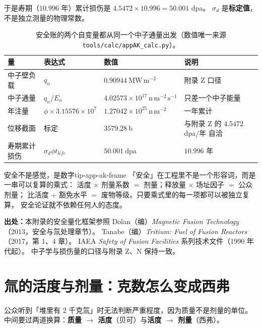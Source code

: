 于是寿期（$10.996$ 年）累计损伤是 $4.5472\times10.996=50.001$ dpa。
$\sigma_d$ 是\textbf{标定值}，不是独立测量的物理常数。

\begin{table}[htbp]
\centering
\small
\caption{安全账的两个自变量都从同一个中子通量出发（数值唯一来源 \texttt{tools/\allowbreak{}calc/\allowbreak{}appAK\_calc.py}）。}
\label{tab:app-ak-frame}
\begin{tabular}{p{3.4cm}p{3.3cm}p{3.1cm}p{3.9cm}}
\toprule
量 & 表达式 & 数值 & 说明 \\
\midrule
中子壁负载 & $q_n$ & $0.90944\ \mathrm{MW\,m^{-2}}$ & 附录 Z 口径 \\
中子通量 & $q_n/E_n$ & $4.02573\times10^{17}\ \mathrm{n\,m^{-2}\,s^{-1}}$ & 只差一个中子能量 \\
年注量 & $\phi\times3.15576\times10^{7}$ & $1.27042\times10^{25}\ \mathrm{n\,m^{-2}}$ & 一年累计 \\
位移截面 & 标定 & $3579.28\ \mathrm{b}$ & 与附录 Z 的 $4.5472$ dpa/年 自洽 \\
寿期累计损伤 & $\sigma_d\phi t_{life}$ & $50.001\ \mathrm{dpa}$ & $10.996$ 年 \\
\bottomrule
\end{tabular}

\end{table}

\begin{tip}{安全不是感觉，是数字}{tip-app-ak-frame}
「安全」在工程里不是一个形容词，而是一串可以复算的乘式：
活度 $\times$ 剂量系数 $=$ 剂量；释放量 $\times$ 场址因子 $=$ 公众剂量；
比活度 $\div$ 豁免水平 $=$ 废物等级。只要乘式里的每一项都可以被独立复算，
安全论证就不依赖任何人的态度。
\end{tip}

{\footnotesize
\textbf{出处：}本附录的安全量化框架参照 Dolan（编）\emph{Magnetic Fusion Technology}（2013，安全与氚处理章节）。
Tanabe（编）\emph{Tritium: Fuel of Fusion Reactors}（2017，第 1、4 章）。
IAEA \emph{Safety of Fusion Facilities} 系列技术文件（1990 年代起）。
中子学与损伤量的口径与附录 Z、N 保持一致。
}

\section{氚的活度与剂量：克数怎么变成西弗}
\label{sec:app-ak-tritium}

公众听到「堆里有 2 千克氚」时无法判断严重程度，因为质量不是剂量的单位。
中间要过两道换算：\textbf{质量 $\to$ 活度}（贝可）与\textbf{活度 $\to$ 剂量}（西弗）。

